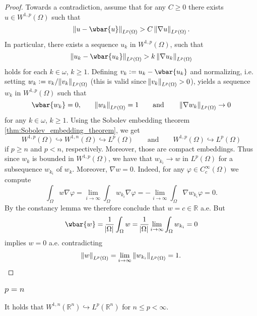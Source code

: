 \begin{proof}
	Towards a contradiction, assume that for any $C \geq 0$ there exists $u \in W^{1,p}(\Omega)$ such that 
	\begin{equation*}
		\norm[0]{u - \wbar{u}}_{L^p(\Omega)} > C \norm[0]{\nabla u}_{L^p(\Omega)}.
	\end{equation*}
	In particular, there exists a sequence $u_k$ in $W^{1,p}(\Omega)$, such that 
	\begin{equation*}
		\norm[0]{u_k - \wbar{u_k}}_{L^p(\Omega)} > k \norm[0]{\nabla u_k}_{L^p(\Omega)}
	\end{equation*}
	\noindent holds for each $k \in \omega$, $k \geq 1$. Defining $v_k := u_k - \wbar{u_k}$ and normalizing, i.e. setting $w_k := v_k/\norm{v_k}_{L^p(\Omega)}$ (this is valid since $\norm{v_k}_{L^p(\Omega)} > 0$), yields a sequence $w_k$ in $W^{1,p}(\Omega)$ such that 
	\begin{equation*}
		\wbar{w_k} = 0, \qquad \norm{w_k}_{L^p(\Omega)} = 1 \qquad \text{and} \qquad \norm[0]{\nabla w_k}_{L^p(\Omega)} \to 0
	\end{equation*}
	\noindent for any $k \in \omega$, $k \geq 1$. Using the Sobolev embedding theorem \ref{thm:Sobolev_embedding_theorem}, we get
	\begin{equation*}
		W^{1,p}(\Omega) \hookrightarrow W^{1,n}(\Omega) \hookrightarrow L^p(\Omega) \qquad \text{and} \qquad W^{1,p}(\Omega) \hookrightarrow L^p(\Omega)
	\end{equation*}
	\noindent if $p \geq n$ and $p < n$, respectively. Moreover, those are compact embeddings. Thus since $w_k$ is bounded in $W^{1,p}(\Omega)$, we have that $w_{k_i} \to w$ in $L^p(\Omega)$ for a subsequence $w_{k_i}$ of $w_k$. Moreover, $\nabla w = 0$. Indeed, for any $\varphi \in C^\infty_c(\Omega)$ we compute
	\begin{equation*}
		\int_\Omega w\nabla \varphi = \lim_{i \to \infty}\int_\Omega w_{k_i}\nabla\varphi = -\lim_{i \to \infty}\int_\Omega \nabla w_{k_i}\varphi = 0.
	\end{equation*}
	By the constancy lemma we therefore conclude that $w = c \in \mathbb{R}$ a.e. But
	\begin{equation*}
		\wbar{w} = \frac{1}{\abs{\Omega}} \int_\Omega w = \frac{1}{\abs{\Omega}} \lim_{i \to \infty} \int_\Omega w_{k_i} = 0
	\end{equation*}
	\noindent implies $w = 0$ a.e. contradicting
	\begin{equation*}
		\norm{w}_{L^p(\Omega)} = \lim_{i \to \infty} \norm[0]{w_{k_i}}_{L^p(\Omega)} = 1.
	\end{equation*}
\end{proof}

\subsubsection*{$p = n$}

\begin{theorem}
	It holds that $W^{1,n}(\mathbb{R}^n) \hookrightarrow L^p(\mathbb{R}^n)$ for $n \leq p < \infty$.
\end{theorem}





\printbibliography


